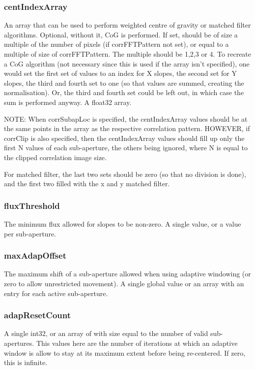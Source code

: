 \documentclass[a4,10pt]{article}
\begin{document}
\subsubsection{centIndexArray}
An array that can be used to perform weighted centre of gravity or
matched filter algorithms.  Optional, without it, CoG is performed.
If set, should be of size a multiple of the number of pixels (if
corrFFTPattern not set), or equal to a multiple of size of
corrFFTPattern.  The multiple should be 1,2,3 or 4.  To recreate a CoG
algorithm (not necessary since this is used if the array isn't
specified), one would set the first set of
values to an index for X slopes, the second set for Y slopes, the
third and fourth set to one (so that values are summed, creating the
normalisation).  Or, the third and fourth set could be left out, in
which case the sum is performed anyway.  A float32 array.

NOTE:  When corrSubapLoc is specified, the centIndexArray values
should be at the same points in the array as the respective
correlation pattern.  HOWEVER, if corrClip is also specified, then the
centIndexArray values should fill up only the first N values of each
sub-aperture, the others being ignored, where N is equal to the
clipped correlation image size.

For matched filter, the last two sets should be zero (so that no
division is done), and the first two filled with the x and y matched filter.


\subsubsection{fluxThreshold}
The minimum flux allowed for slopes to be non-zero.  A single value,
or a value per sub-aperture.

\subsubsection{maxAdapOffset}
The maximum shift of a sub-aperture allowed when using adaptive
windowing (or zero to allow unrestricted movement).  A single global
value or an array with an entry for each active sub-aperture.

\subsubsection{adapResetCount}
A single int32, or an array of with size equal to the number of valid
sub-apertures.  This values here are the number of iterations at which
an adaptive window is allow to stay at its maximum extent before being
re-centered.  If zero, this is infinite.
\end{document}
